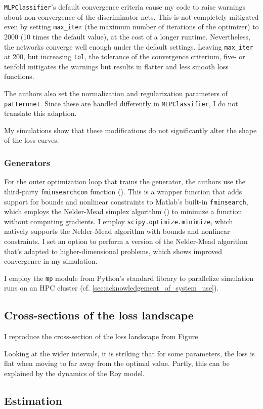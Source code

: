 \texttt{MLPClassifier}'s default convergence criteria cause my code to raise warnings about non-convergence of the discriminator nets.
This is not completely mitigated even by setting \texttt{max\_iter} (the maximum number of iterations of the optimizer) to 2000 (10 times the default value), at the cost of a longer runtime. %
Nevertheless, the networks converge well enough under the default settings. %
Leaving \texttt{max\_iter} at 200, but increasing \texttt{tol}, the tolerance of the convergence criterium, five- or tenfold mitigates the warnings but results in flatter and less smooth loss functions. %

The authors also set the normalization and regularization parameters of \texttt{patternnet}.
Since these are handled differently in \texttt{MLPClassifier}, I do not translate this adaption.

My simulations show that these modifications do not significantly alter the shape of the loss curves. %

\subsubsection{Generators}

For the outer optimization loop that trains the generator, the authors use the third-party \texttt{fminsearchcon} function (\textcite{DErrico2024}).
This is a wrapper function that adds support for bounds and nonlinear constraints to Matlab's built-in \texttt{fminsearch}, which employs the Nelder-Mead simplex algorithm (\textcite{lagarias1998convergence}) to minimize a function without computing gradients.
I employ \texttt{scipy.optimize.minimize}, which natively supports the Nelder-Mead algorithm with bounds and nonlinear constraints.
I set an option to perform a version of the Nelder-Mead algorithm that's adapted to higher-dimensional problems, which shows improved convergence in my simulation. %

I employ the \texttt{mp} module from Python's standard library to parallelize simulation runs on an HPC cluster (cf. \ref{sec:acknowledgement_of_system_use}).

\subsection{Cross-sections of the loss landscape}

I reproduce the cross-section of the loss landscape from Figure %

Looking at the wider intervals, it is striking that for some parameters, the loss is flat when moving to far away from the optimal value.
Partly, this can be explained by the dynamics of the Roy model.

\subsection{Estimation}
